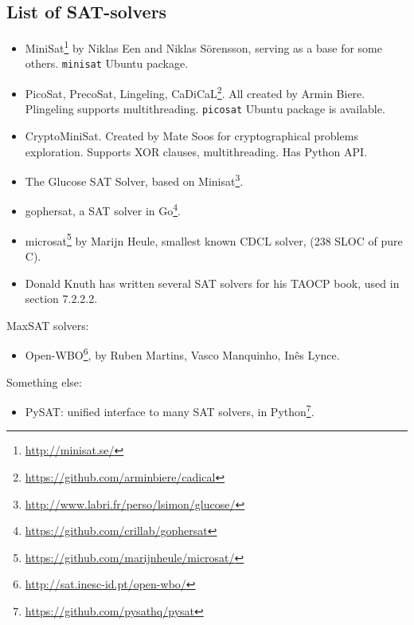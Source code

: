 \subsection{List of SAT-solvers}


\begin{itemize}

\item MiniSat\footnote{\url{http://minisat.se/}} by Niklas Een and Niklas Sörensson, serving as a base for some others.
\verb|minisat| Ubuntu package.

\item PicoSat, PrecoSat, Lingeling, CaDiCaL\footnote{\url{https://github.com/arminbiere/cadical}}.
All created by Armin Biere. Plingeling supports multithreading.
\verb|picosat| Ubuntu package is available.

\item CryptoMiniSat. Created by Mate Soos for cryptographical problems exploration.
Supports XOR clauses, multithreading.
Has Python API.

\item The Glucose SAT Solver, based on Minisat\footnote{\url{http://www.labri.fr/perso/lsimon/glucose/}}.

\item gophersat, a SAT solver in Go\footnote{\url{https://github.com/crillab/gophersat}}.

\item microsat\footnote{\url{https://github.com/marijnheule/microsat/}} by Marijn Heule, smallest known CDCL solver, (238 SLOC of pure C).

\item Donald Knuth has written several SAT solvers for his TAOCP book, used in section 7.2.2.2.

\end{itemize}

MaxSAT solvers:

\begin{itemize}

\item Open-WBO\footnote{\url{http://sat.inesc-id.pt/open-wbo/}}, by Ruben Martins, Vasco Manquinho, Inês Lynce.

\end{itemize}

Something else:

\begin{itemize}

\item PySAT: unified interface to many SAT solvers, in Python\footnote{\url{https://github.com/pysathq/pysat}}.

\end{itemize}

